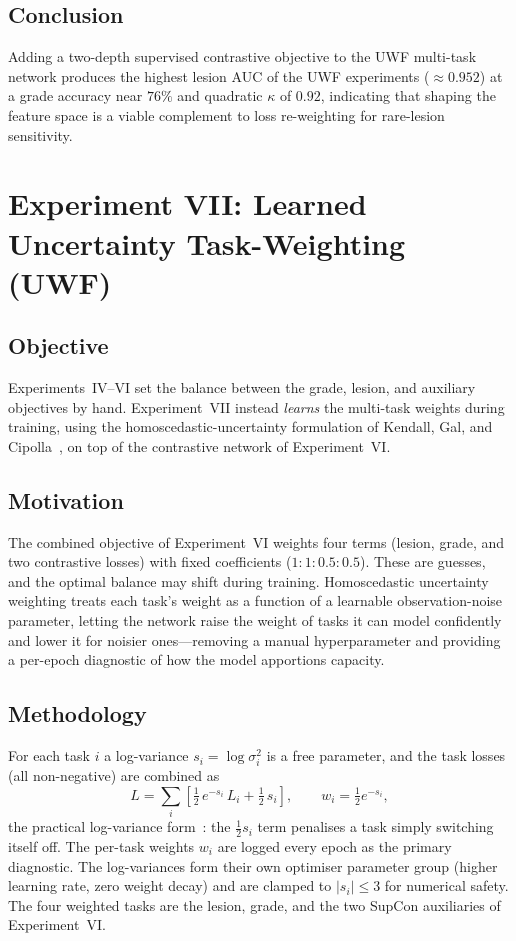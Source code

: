 \documentclass[journal,twoside,web]{ieeecolor}
\begin{document}
\subsection{Conclusion}
Adding a two-depth supervised contrastive objective to the UWF multi-task network
produces the highest lesion AUC of the UWF experiments ($\approx0.952$) at a grade
accuracy near $76\%$ and quadratic $\kappa$ of $0.92$, indicating that shaping the
feature space is a viable complement to loss re-weighting for rare-lesion
sensitivity.

\section{Experiment VII: Learned Uncertainty Task-Weighting (UWF)}
\label{sec:exp7}

\subsection{Objective}
Experiments~IV--VI set the balance between the grade, lesion, and auxiliary
objectives by hand. Experiment~VII instead \emph{learns} the multi-task weights
during training, using the homoscedastic-uncertainty formulation of Kendall,
Gal, and Cipolla~\cite{uncertainty}, on top of the contrastive network of
Experiment~VI.

\subsection{Motivation}
The combined objective of Experiment~VI weights four terms (lesion, grade, and two
contrastive losses) with fixed coefficients ($1{:}1{:}0.5{:}0.5$). These are guesses,
and the optimal balance may shift during training. Homoscedastic uncertainty
weighting treats each task's weight as a function of a learnable observation-noise
parameter, letting the network raise the weight of tasks it can model confidently
and lower it for noisier ones---removing a manual hyperparameter and providing a
per-epoch diagnostic of how the model apportions capacity.

\subsection{Methodology}
For each task $i$ a log-variance $s_i=\log\sigma_i^2$ is a free parameter, and the
task losses (all non-negative) are combined as
\begin{equation}
L = \sum_i \left[\tfrac{1}{2}\,e^{-s_i}\,L_i + \tfrac{1}{2}\,s_i\right],
\qquad w_i = \tfrac{1}{2}e^{-s_i},
\label{eq:uw}
\end{equation}
the practical log-variance form~\cite{uncertainty}: the $\tfrac12 s_i$ term
penalises a task simply switching itself off. The per-task weights $w_i$ are logged
every epoch as the primary diagnostic. The log-variances form their own optimiser
parameter group (higher learning rate, zero weight decay) and are clamped to
$|s_i|\le 3$ for numerical safety. The four weighted tasks are the lesion, grade,
and the two SupCon auxiliaries of Experiment~VI.
\end{document}
